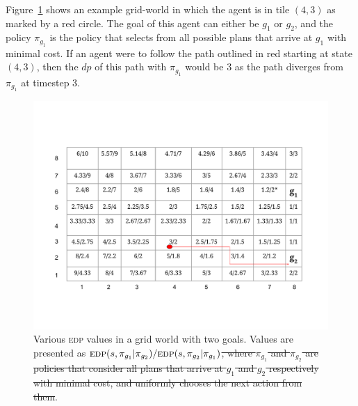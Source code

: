 \documentclass[letterpaper]{article}
\providecommand{\DIFaddtex}[1]{{\protect\color{blue}\uwave{#1}}} %
\providecommand{\DIFdeltex}[1]{{\protect\color{red}\sout{#1}}}                      %
\providecommand{\DIFaddFL}[1]{\DIFadd{#1}} %
\providecommand{\DIFdelFL}[1]{\DIFdel{#1}} %
\providecommand{\DIFaddbeginFL}{} %
\providecommand{\DIFaddendFL}{} %
\providecommand{\DIFdelbeginFL}{} %
\providecommand{\DIFdelendFL}{} %
\providecommand{\DIFadd}[1]{\texorpdfstring{\DIFaddtex{#1}}{#1}} %
\providecommand{\DIFdel}[1]{\texorpdfstring{\DIFdeltex{#1}}{}} %
\newcommand{\DIFscaledelfig}{0.5}
\newlength{\DIFdelgraphicswidth} %
\newlength{\DIFdelgraphicsheight} %
\newcommand{\DIFaddincludegraphics}[2][]{{\color{blue}\fbox{\DIFOincludegraphics[#1]{#2}}}} %
\newcommand{\DIFdelincludegraphics}[2][]{%
\sbox{\DIFdelgraphicsbox}{\DIFOincludegraphics[#1]{#2}}%
\settoboxwidth{\DIFdelgraphicswidth}{\DIFdelgraphicsbox} %
\settoboxtotalheight{\DIFdelgraphicsheight}{\DIFdelgraphicsbox} %
\scalebox{\DIFscaledelfig}{%
\parbox[b]{\DIFdelgraphicswidth}{\usebox{\DIFdelgraphicsbox}\\[-\baselineskip] \rule{\DIFdelgraphicswidth}{0em}}\llap{\resizebox{\DIFdelgraphicswidth}{\DIFdelgraphicsheight}{%
\setlength{\unitlength}{\DIFdelgraphicswidth}%
\begin{picture}(1,1)%
\thicklines\linethickness{2pt} %
{\color[rgb]{1,0,0}\put(0,0){\framebox(1,1){}}}%
{\color[rgb]{1,0,0}\put(0,0){\line( 1,1){1}}}%
{\color[rgb]{1,0,0}\put(0,1){\line(1,-1){1}}}%
\end{picture}%
}\hspace*{3pt}}} %
} %
\DeclareRobustCommand{\DIFaddbeginFL}{\DIFOaddbeginFL \let\includegraphics\DIFaddincludegraphics} %
\DeclareRobustCommand{\DIFaddendFL}{\DIFOaddendFL \let\includegraphics\DIFOincludegraphics} %
\DeclareRobustCommand{\DIFdelbeginFL}{\DIFOdelbeginFL \let\includegraphics\DIFdelincludegraphics} %
\DeclareRobustCommand{\DIFdelendFL}{\DIFOaddendFL \let\includegraphics\DIFOincludegraphics} %
\begin{document}
Figure~\ref{fig:edp} shows an example grid-world in which the agent is in tile $(4,3)$ as marked by a red circle. The goal of this agent can either be $g_1$ or $g_2$, and the policy $\pi_{g_1}$ is the policy that selects from all possible plans that arrive at $g_1$ with minimal cost.
If an agent were to follow the path outlined in red starting at state $(4,3)$, then the $dp$ of this path with $\pi_{g_1}$ would be 3 as the path diverges from $\pi_{g_1}$ at timestep 3. 

\begin{figure}
    \centering
    \includegraphics[trim= 40 100 40 0, clip,width=\linewidth]{Figures/EDP_heatMap.pdf}
    \caption{Various \textsc{edp} values in a grid world with two goals. Values are presented as \DIFdelbeginFL \DIFdelFL{$\textsc{edp}(s,\pi_{g_1} | \pi_{g_2})/\textsc{edp}(s, \pi_{g_2} | \pi_{g_1})$, where $\pi_{g_1}$ and $\pi_{g_2}$ are policies that consider all plans that arrive at $g_1$ and $g_2$ respectively with minimal cost, and uniformly chooses the next action from them}\DIFdelendFL \DIFaddbeginFL \DIFaddFL{$\textsc{edp}(s,\hat{\pi}_{g_1} | \hat{\pi}_{g_2})/\textsc{edp}(s, \hat{\pi}_{g_2} | \hat{\pi}_{g_1})$}\DIFaddendFL .}%
    \label{fig:edp}
\end{figure}
\end{document}
